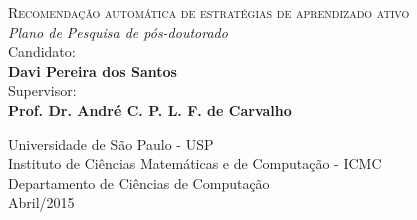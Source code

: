 \begin{titlepage}

\begin{center}


\normalfont \Large \textsc{Recomendação automática de estratégias de aprendizado ativo}\\[1cm]

\normalfont \normalsize \textit{Plano de Pesquisa de pós-doutorado}\\[1cm]

\Large Candidato:\\

\textbf{Davi Pereira dos Santos}\\[1cm]

Supervisor:\\

\textbf{Prof. Dr. André C. P. L. F. de Carvalho}\\[1cm]



\normalsize

Universidade de S\~{a}o Paulo - USP\\

Instituto de Ci\^{e}ncias Matem\'{a}ticas e de Computa\c{c}\~{a}o - ICMC\\

Departamento de Ci\^{e}ncias de Computa\c{c}\~{a}o\\[0.5cm]





Abril/2015\\[1cm]







\end{center}







\begin{abstract}



\end{abstract}



\end{titlepage}